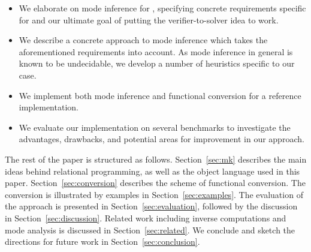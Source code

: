 \begin{itemize}
\item We elaborate on mode inference for \mk, specifying concrete requirements specific for \mk and our ultimate goal of putting the verifier-to-solver idea to work.
\item We describe a concrete approach to mode inference which takes the aforementioned requirements into account. As mode inference in general is known to be undecidable, we develop a number of heuristics specific to our case.
\item We implement both mode inference and functional conversion for a reference \mk implementation.
\item We evaluate our implementation on several benchmarks to investigate the advantages, drawbacks, and potential areas for improvement in our approach.
\end{itemize}

The rest of the paper is structured as follows.
Section~\ref{sec:mk} describes the main ideas behind relational programming, as well as the object language used in this paper.
Section~\ref{sec:conversion} describes the scheme of functional conversion.
The conversion is illustrated by examples in Section~\ref{sec:examples}.
The evaluation of the approach is presented in Section~\ref{sec:evaluation}, followed by the discussion in Section~\ref{sec:discussion}.
Related work including inverse computations and mode analysis is discussed in Section~\ref{sec:related}.
We conclude and sketch the directions for future work in Section~\ref{sec:conclusion}.
